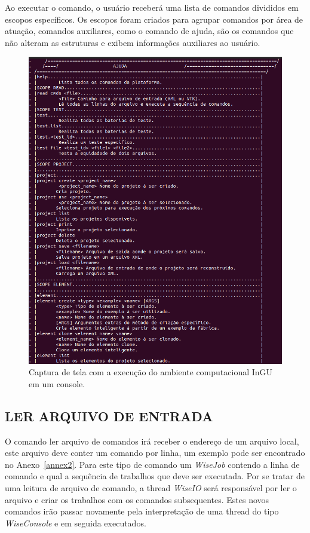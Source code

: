 \documentclass[a4paper,12pt]{monografia}
\theoremstyle{plain}
\theoremstyle{definition}
\theoremstyle{remark}
\begin{document}
Ao executar o comando, o usuário receberá uma lista de comandos divididos em escopos específicos. Os escopos foram criados para agrupar comandos por área de atuação, comandos auxiliares, como o comando de ajuda, são os comandos que não alteram as estruturas e exibem informações auxiliares ao usuário.


\begin{figure}[!htbp]
	\centering
	\includegraphics[scale=0.45]{Figures/InGU_help.png}
	\caption{Captura de tela com a execução do ambiente computacional InGU em um console.}
	\label{fig10:ajuda}
\end{figure}


\subsection{LER ARQUIVO DE ENTRADA}\label{sec:read_cmds}


O comando ler arquivo de comandos irá receber o endereço de um arquivo local, este arquivo deve conter um comando por linha, um exemplo pode ser encontrado no Anexo~\ref{annex2}. Para este tipo de comando um \textit{WiseJob} contendo a linha de comando e qual a sequência de trabalhos que deve ser executada. Por se tratar de uma leitura de arquivo de comando, a thread \textit{WiseIO} será responsável por ler o arquivo e criar os trabalhos com os comandos subsequentes. Estes novos comandos irão passar novamente pela interpretação de uma thread do tipo \textit{WiseConsole} e em seguida executados.
\end{document}

